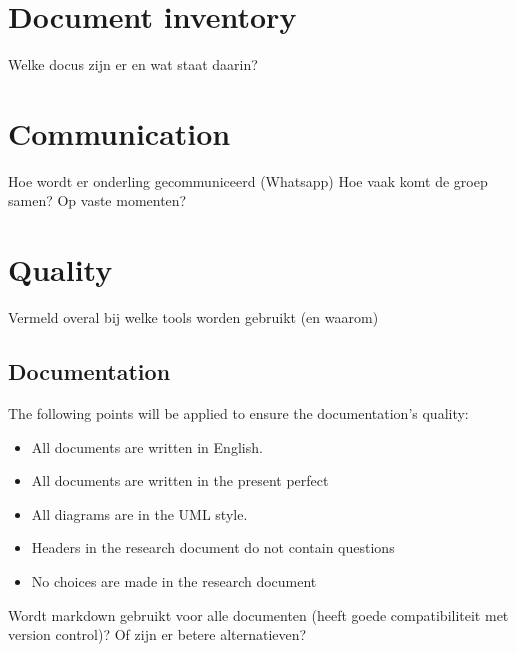\documentclass{article} %
\begin{document}
    \section{Document inventory}
    Welke docus zijn er en wat staat daarin?
    \newpage

    \section{Communication}
    Hoe wordt er onderling gecommuniceerd (Whatsapp)
    Hoe vaak komt de groep samen? Op vaste momenten?
    \newpage

    \section{Quality}
    Vermeld overal bij welke tools worden gebruikt (en waarom)
    \subsection{Documentation}
    The following points will be applied to ensure the documentation’s quality:
    \begin{itemize}
        \item All documents are written in English.
        \item All documents are written in the present perfect
        \item All diagrams are in the UML style.
        \item Headers in the research document do not contain questions
        \item No choices are made in the research document
    \end{itemize}
    Wordt markdown gebruikt voor alle documenten (heeft goede compatibiliteit met version control)? Of zijn er betere alternatieven?
\end{document}
